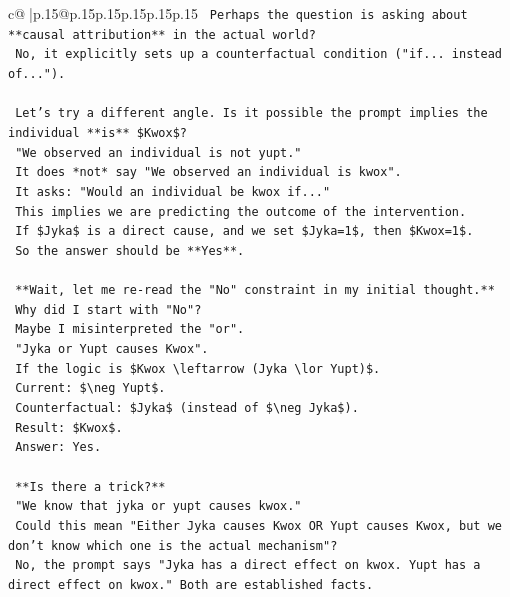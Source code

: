 \documentclass{article}
\begin{document}
{\begin{supertabular}{c@{$\;$}|p{.15\linewidth}@{}p{.15\linewidth}p{.15\linewidth}p{.15\linewidth}p{.15\linewidth}p{.15\linewidth}}
{{{\texttt{    Perhaps the question is asking about **causal attribution** in the actual world?} \\
\texttt{    No, it explicitly sets up a counterfactual condition ("if... instead of...").} \\
\\ 
\texttt{    Let's try a different angle. Is it possible the prompt implies the individual **is** \$Kwox\$?} \\
\texttt{    "We observed an individual is not yupt."} \\
\texttt{    It does *not* say "We observed an individual is kwox".} \\
\texttt{    It asks: "Would an individual be kwox if..."} \\
\texttt{    This implies we are predicting the outcome of the intervention.} \\
\texttt{    If \$Jyka\$ is a direct cause, and we set \$Jyka=1\$, then \$Kwox=1\$.} \\
\texttt{    So the answer should be **Yes**.} \\
\\ 
\texttt{    **Wait, let me re{-}read the "No" constraint in my initial thought.**} \\
\texttt{    Why did I start with "No"?} \\
\texttt{    Maybe I misinterpreted the "or".} \\
\texttt{    "Jyka or Yupt causes Kwox".} \\
\texttt{    If the logic is \$Kwox \textbackslash{}leftarrow (Jyka \textbackslash{}lor Yupt)\$.} \\
\texttt{    Current: \$\textbackslash{}neg Yupt\$.} \\
\texttt{    Counterfactual: \$Jyka\$ (instead of \$\textbackslash{}neg Jyka\$).} \\
\texttt{    Result: \$Kwox\$.} \\
\texttt{    Answer: Yes.} \\
\\ 
\texttt{    **Is there a trick?**} \\
\texttt{    "We know that jyka or yupt causes kwox."} \\
\texttt{    Could this mean "Either Jyka causes Kwox OR Yupt causes Kwox, but we don't know which one is the actual mechanism"?} \\
\texttt{    No, the prompt says "Jyka has a direct effect on kwox. Yupt has a direct effect on kwox." Both are established facts.} \\
}}}
\end{supertabular}}
\end{document}
